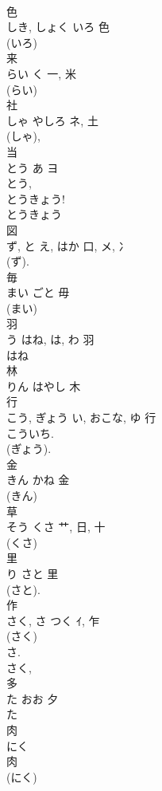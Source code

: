 \documentclass[8pt]{extreport}
\begin{document}
\begin{CJK}{UTF8}{min}
\\	色	
\\	しき, しょく	いろ	色	
\\	(いろ) 
\\	来	
\\	らい	く	一, 米	
\\	(らい) 
\\	社	
\\	しゃ	やしろ	ネ, 土	
\\	(しゃ), 
\\	当	
\\	とう	あ	ヨ		
\\	とう, 
\\	とうきょう!
\\	とうきょう 
\\	図	
\\	ず, と	え, はか	口, メ, 冫	
\\	(ず).	
\\	毎	
\\	まい	ごと	毋		
\\	(まい) 
\\	羽	
\\	う	はね, は, わ	羽	
\\	はね 
\\	林	
\\	りん	はやし	木	
\\	行	
\\	こう, ぎょう	い, おこな, ゆ	行	
\\	こういち. 
\\	(ぎょう).
\\	金	
\\	きん	かね	金	
\\	(きん) 
\\	草	
\\	そう	くさ	艹, 日, 十	
\\	(くさ) 
\\	里	
\\	り	さと	里	
\\	(さと). 
\\	作	
\\	さく, さ	つく	ｲ, 乍	
\\	(さく) 
\\	さ. 
\\	さく, 
\\	多	
\\	た	おお	夕	
\\	た 
\\	肉	
\\	にく	
\\	肉	
\\	(にく) 

\end{CJK}
\end{document}
